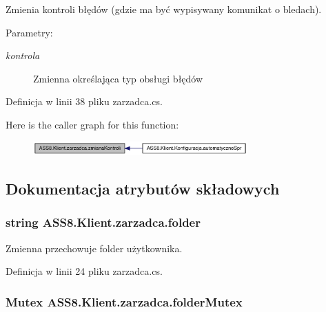 Zmienia kontroli błędów (gdzie ma być wypisywany komunikat o bledach). 

\begin{Desc}
\item[Parametry:]
\begin{description}
\item[{\em kontrola}]Zmienna określająca typ obsługi błędów\end{description}
\end{Desc}


Definicja w linii 38 pliku zarzadca.cs.

Here is the caller graph for this function:\nopagebreak
\begin{figure}[H]
\begin{center}
\leavevmode
\includegraphics[width=233pt]{d1/dc6/a00037_facd9f376d18bedf9eb790ea68e23cf2_icgraph}
\end{center}
\end{figure}


\subsection{Dokumentacja atrybutów składowych}
\hypertarget{a00037_e91fc8825b76e32fee5742c3454aaee0}{
\subsubsection[{folder}]{\setlength{\rightskip}{0pt plus 5cm}string {\bf ASS8.Klient.zarzadca.folder}}}
\label{d1/dc6/a00037_e91fc8825b76e32fee5742c3454aaee0}


Zmienna przechowuje folder użytkownika. 



Definicja w linii 24 pliku zarzadca.cs.\hypertarget{a00037_1ff0a9cb09ec0877a4411793dc5683f7}{
\subsubsection[{folderMutex}]{\setlength{\rightskip}{0pt plus 5cm}Mutex {\bf ASS8.Klient.zarzadca.folderMutex}}}
\label{d1/dc6/a00037_1ff0a9cb09ec0877a4411793dc5683f7}




